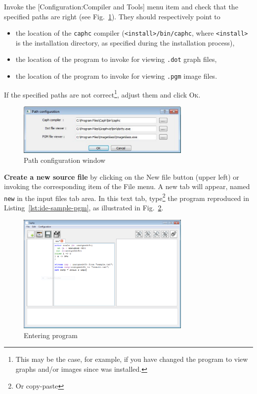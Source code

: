 \medskip
Invoke the [\textsf{Configuration:Compiler and Tools}] menu item and check that the specified paths
are right (see Fig.~\ref{fig:config-window}). They should respectively point to 
\begin{itemize}
\item the location of the \texttt{caphc} compiler (\verb|<install>/bin/caphc|, where
  \verb|<install>| is the \caph installation directory, as specified during the installation
  process),
\item the location of the program to invoke for viewing \verb|.dot| graph files, 
\item the location of the program to invoke for viewing \verb|.pgm| image files. 
\end{itemize}
If the specified paths are not correct\footnote{This may be the case, for example, if you have
  changed the program to view graphs and/or images since \caph was installed.}, adjust them and click \textsc{Ok}.

\begin{figure}[h]
  \centering
  \includegraphics[width=0.75\textwidth]{figs/ide/config}
  \caption{Path configuration window}
  \label{fig:config-window}
\end{figure}

\medskip \textbf{Create a new source file} by clicking on the \textsf{New file} button (upper left)
or invoking the corresponding item of the \textsf{File} menu. A new tab will appear, named
\texttt{new} in the input files tab area. In this text tab, type\footnote{Or copy-paste} the program
reproduced in Listing~\ref{lst:ide-sample-pgm}, as illustrated in Fig.~\ref{fig:first-program}. 

\begin{figure}[h]
  \centering
  \includegraphics[width=0.75\textwidth]{figs/ide/first-program}
  \caption{Entering program}
  \label{fig:first-program}
\end{figure}

